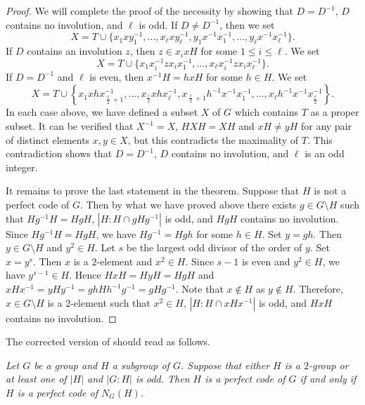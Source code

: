 \documentclass[12pt, a4paper]{article}
\theoremstyle{definition}
\newenvironment{manualtheorem}[1]{%
  \renewcommand\themanualtheoreminner{#1}%
  \manualtheoreminner
}{\endmanualtheoreminner}
\begin{document}
\begin{proof}
We will complete the proof of the necessity by showing that $D=D^{-1}$, $D$ contains no involution, and $\ell$ is odd.
If $D\neq D^{-1}$, then we set
\begin{equation*}
X=T\cup\{x_{1}xy_{1}^{-1},\ldots,x_{\ell}xy_{\ell}^{-1},y_{1}x^{-1}x_{1}^{-1},
\ldots,y_{\ell}x^{-1}x_{\ell}^{-1}\}.
\end{equation*}
If $D$ contains an involution $z$, then $z\in x_{i}xH$ for some
$1\leq i\leq\ell$. We set
\begin{equation*}
X=T\cup\{x_{1}x_{i}^{-1}zx_{i}x_{1}^{-1},\ldots,
x_{\ell}x_{i}^{-1}zx_{i}x_{\ell}^{-1}\}.
\end{equation*}
If $D=D^{-1}$ and $\ell$ is even, then $x^{-1}H=hxH$ for some $h\in H$. We set
\begin{equation*}
X=T\cup \left\{x_{1}xhx_{\frac{\ell}{2}+1}^{-1},\ldots,x_{\frac{\ell}{2}}xhx_{\ell}^{-1},
x_{\frac{\ell}{2}+1}h^{-1}x^{-1}x_{1}^{-1},\ldots,x_{\ell}h^{-1}x^{-1}x_{\frac{\ell}{2}}^{-1}\right\}.
\end{equation*}
In each case above, we have defined a subset $X$ of $G$ which contains $T$ as a proper subset. It can be verified that $X^{-1} = X$, $HXH=XH$ and $xH\neq yH$ for any pair of distinct elements $x,y\in X$, but this contradicts the maximality of $T$. This contradiction shows that $D=D^{-1}$, $D$ contains no involution, and $\ell$ is an odd integer.

It remains to prove the last statement in the theorem. Suppose that $H$ is not a perfect code of $G$. Then by what we have proved above there exists $g\in G\setminus H$ such that $Hg^{-1}H=HgH$, $|H:H\cap gHg^{-1}|$ is odd, and $HgH$ contains no involution. Since $Hg^{-1}H=HgH$, we have $Hg^{-1}=Hgh$ for some $h\in H$. Set $y=gh$. Then $y\in G\setminus H$ and $y^2\in H$. Let $s$ be the largest odd divisor of the order of $y$. Set $x=y^{s}$. Then $x$ is a $2$-element and $x^2 \in H$. Since $s-1$ is even and $y^2\in H$, we have $y^{s-1}\in H$. Hence $HxH=HyH=HgH$ and $xHx^{-1}=yHy^{-1}=ghHh^{-1}g^{-1}=gHg^{-1}$. Note that $x \not \in H$ as $y \not \in H$. Therefore, $x \in G\setminus H$ is a $2$-element such that $x^{2}\in H$,  $|H:H\cap xHx^{-1}|$ is odd, and $HxH$ contains no involution.
\end{proof}

The corrected version of \cite[Theorem 3.2]{ZZ21} should read as follows.

\begin{manualtheorem}{3.2}
\label{normal}
{\em Let $G$ be a group and $H$ a subgroup of $G$. Suppose that either $H$ is a $2$-group or at least one of $|H|$ and $|G:H|$ is odd. Then $H$ is a perfect code of $G$ if and only if $H$ is a perfect code of $N_{G}(H)$.}
\end{manualtheorem}
\end{document}
